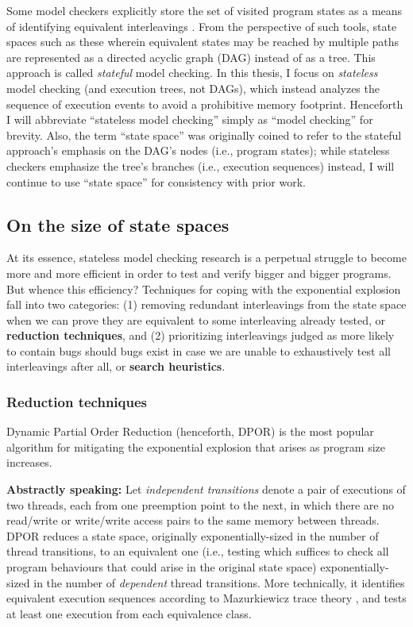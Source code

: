 Some model checkers explicitly store the set of visited program states as a means of identifying equivalent interleavings \cite{spin}.
From the perspective of such tools, state spaces such as these wherein equivalent states may be reached by multiple paths
are represented as a directed acyclic graph (DAG) instead of as a tree.
This approach is called {\em stateful} model checking.
In this thesis, I focus on {\em stateless} model checking (and execution trees, not DAGs),
which instead analyzes the sequence of execution events to avoid a prohibitive memory footprint.
Henceforth I will abbreviate ``stateless model checking'' simply as ``model checking'' for brevity.
Also, the term ``state space'' was originally coined to refer to the stateful approach's emphasis on the DAG's nodes
(i.e., program states);
while stateless checkers emphasize the tree's branches (i.e., execution sequences) instead,
I will continue to use ``state space'' for consistency with prior work.

\subsection{On the size of state spaces}

At its essence, stateless model checking research is a perpetual struggle to become more and more efficient in order to test and verify bigger and bigger programs.
But whence this efficiency?
Techniques for coping with the exponential explosion fall into two categories:
(1) removing redundant interleavings from the state space when we can prove they are equivalent to some interleaving already tested,
or {\bf reduction techniques},
and
(2) prioritizing interleavings judged as more likely to contain bugs should bugs exist
in case we are unable to exhaustively test all interleavings after all,
or {\bf search heuristics}.

\subsubsection{Reduction techniques}

Dynamic Partial Order Reduction \cite{dpor} (henceforth, DPOR) is the most popular algorithm for mitigating the exponential explosion that arises as program size increases.

{\bf Abstractly speaking:}
Let {\em independent transitions} denote a pair of executions of two threads, each from one preemption point to the next,
in which there are no read/write or write/write access pairs to the same memory between threads.
DPOR reduces a state space, originally exponentially-sized in the number of thread transitions,
to an equivalent one
(i.e., testing which suffices to check all program behaviours that could arise in the original state space)
exponentially-sized in the number of {\em dependent} thread transitions.
More technically, it identifies equivalent execution sequences according to Mazurkiewicz trace theory \cite{mazurkiewicz},
and tests at least one execution from each equivalence class.

